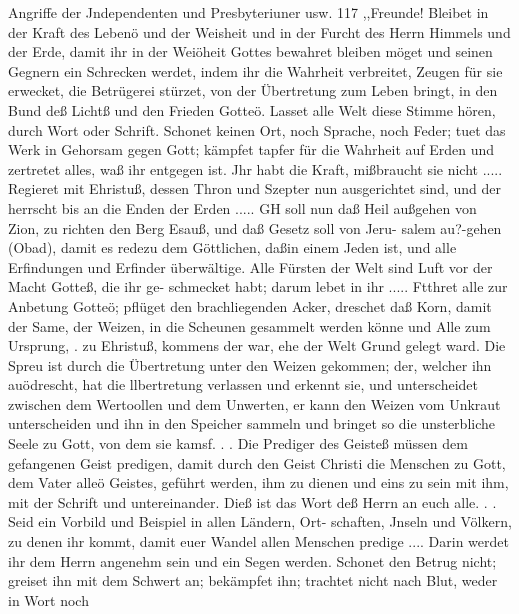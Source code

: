 Angriffe der Jndependenten und Presbyteriuner usw. 117
,,Freunde!
Bleibet in der Kraft des Lebenö und der Weisheit und in
der Furcht des Herrn Himmels und der Erde, damit ihr in der
Weiöheit Gottes bewahret bleiben möget und seinen Gegnern ein
Schrecken werdet, indem ihr die Wahrheit verbreitet, Zeugen für
sie erwecket, die Betrügerei stürzet, von der Übertretung zum
Leben bringt, in den Bund deß Lichtß und den Frieden Gotteö.
Lasset alle Welt diese Stimme hören, durch Wort oder Schrift.
Schonet keinen Ort, noch Sprache, noch Feder; tuet das Werk
in Gehorsam gegen Gott; kämpfet tapfer für die Wahrheit auf
Erden und zertretet alles, waß ihr entgegen ist. Jhr habt die
Kraft, mißbraucht sie nicht ..... Regieret mit Ehristuß, dessen
Thron und Szepter nun ausgerichtet sind, und der herrscht bis an
die Enden der Erden ..... GH soll nun daß Heil außgehen
von Zion, zu richten den Berg Esauß, und daß Gesetz soll von Jeru-
salem au?-gehen (Obad), damit es redezu dem Göttlichen, daßin einem
Jeden ist, und alle Erfindungen und Erfinder überwältige. Alle
Fürsten der Welt sind Luft vor der Macht Gotteß, die ihr ge-
schmecket habt; darum lebet in ihr .....
Ftthret alle zur Anbetung Gotteö; pflüget den brachliegenden
Acker, dreschet daß Korn, damit der Same, der Weizen, in die
Scheunen gesammelt werden könne und Alle zum Ursprung,
. zu Ehristuß, kommens der war, ehe der Welt Grund gelegt ward.
Die Spreu ist durch die Übertretung unter den Weizen gekommen;
der, welcher ihn auödrescht, hat die llbertretung verlassen und
erkennt sie, und unterscheidet zwischen dem Wertoollen und dem
Unwerten, er kann den Weizen vom Unkraut unterscheiden und
ihn in den Speicher sammeln und bringet so die unsterbliche
Seele zu Gott, von dem sie kamsf. . . Die Prediger des Geisteß
müssen dem gefangenen Geist predigen, damit durch den Geist
Christi die Menschen zu Gott, dem Vater alleö Geistes, geführt
werden, ihm zu dienen und eins zu sein mit ihm, mit der Schrift
und untereinander. Dieß ist das Wort deß Herrn an euch alle.
. .   Seid ein Vorbild und Beispiel in allen Ländern, Ort-
schaften, Jnseln und Völkern, zu denen ihr kommt, damit euer
Wandel allen Menschen predige .... Darin werdet ihr dem
Herrn angenehm sein und ein Segen werden.
Schonet den Betrug nicht; greiset ihn mit dem Schwert an;
bekämpfet ihn; trachtet nicht nach Blut, weder in Wort noch


